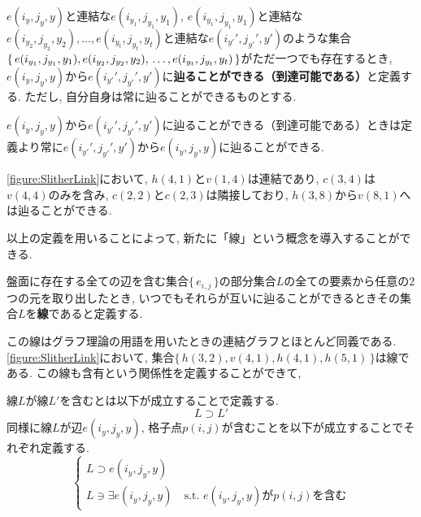 \begin{definition}[到達可能]
  $e(i_y,j_y,y)$と連結な$e(i_{y_1},j_{y_1},y_1)$, $e(i_{y_1},j_{y_1},y_1)$と連結な$e(i_{y_2},j_{y_2},y_2),\ldots,e(i_{y_t},j_{y_t},y_t)$と連結な$e(i_{y'}',j_{y'}',y')$のような集合$\{\,e(i_{y_1},j_{y_1},y_1),e(i_{y_2},j_{y_2},y_2),\\
    \ldots,e(i_{y_t},j_{y_t},y_t)\,\}$がただ一つでも存在するとき, $e(i_y,j_y,y)$から$e(i_{y'}',j_{y'}',y')$に\textbf{辿ることができる（到達可能である）}と定義する. ただし, 自分自身は常に辿ることができるものとする.
\end{definition}

\begin{remark}
  $e(i_y,j_y,y)$から$e(i_{y'}',j_{y'}',y')$に辿ることができる（到達可能である）ときは定義より常に$e(i_{y'}',j_{y'}',y')$から$e(i_y,j_y,y)$に辿ることができる.
\end{remark}

\begin{example}[連結, 含有, 隣接, 到達可能]
  \cref{figure:SlitherLink}において, $h(4,1)$と$v(1,4)$は連結であり, $c(3,4)$は$v(4,4)$のみを含み, $c(2,2)$と$c(2,3)$は隣接しており, $h(3,8)$から$v(8,1)$へは辿ることができる.
\end{example}
以上の定義を用いることによって, 新たに「線」という概念を導入することができる.

\begin{definition}[線]\label{definition:Line}
  盤面に存在する全ての辺を含む集合$\{\,e_{i,j}\,\}$の部分集合$L$の全ての要素から任意の2つの元を取り出したとき, いつでもそれらが互いに辿ることができるときその集合$L$を\textbf{線}であると定義する.
\end{definition}
この線はグラフ理論の用語を用いたときの連結グラフとほとんど同義である. \cref{figure:SlitherLink}において, 集合$\{\,h(3,2),v(4,1),h(4,1),h(5,1)\,\}$は線である. この線も含有という関係性を定義することができて,
\begin{definition}[線の含有]
  線$L$が線$L'$を含むとは以下が成立することで定義する.
  \begin{equation}
    L\supset L'
  \end{equation}
  同様に線$L$が辺$e(i_y,j_y,y)$, 格子点$p(i,j)$が含むことを以下が成立することでそれぞれ定義する.
  \begin{equation}
    \begin{cases}
      {L\supset  e(i_y,j_y,y) } \\
      {L\ni \exists e(i_y,j_y,y) \quad \mbox{s.t. $e(i_y,j_y,y)$が$p(i,j)$を含む}}
    \end{cases}
  \end{equation}
\end{definition}

